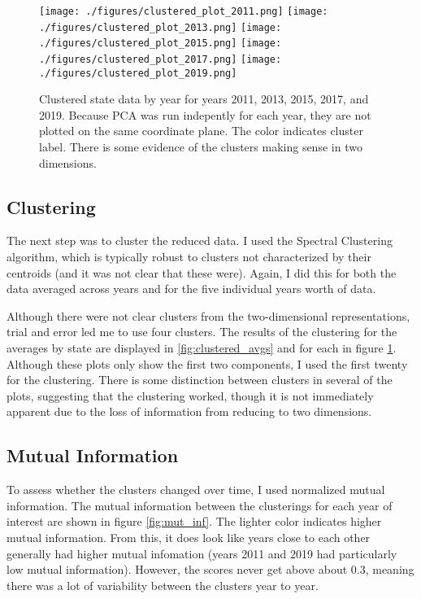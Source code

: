 \documentclass[11pt]{article}
\begin{document}
\begin{figure}[hp]
\texttt{[image: ./figures/clustered\_plot\_2011.png]}
\texttt{[image: ./figures/clustered\_plot\_2013.png]}
\texttt{[image: ./figures/clustered\_plot\_2015.png]}
\texttt{[image: ./figures/clustered\_plot\_2017.png]}
\texttt{[image: ./figures/clustered\_plot\_2019.png]}
\caption{
  Clustered state data by year for years 2011, 2013, 2015, 2017, and 2019. Because PCA was run indepently for each year, they are not plotted on the same coordinate plane. The color indicates cluster label. There is some evidence of the clusters making sense in two dimensions.
}
\label{fig:clustered_data}
\end{figure}

\subsection{Clustering}
The next step was to cluster the reduced data. I used the Spectral Clustering algorithm, which is typically robust to clusters not characterized by their centroids (and it was not clear that these were). Again, I did this for both the data averaged across years and for the five individual years worth of data. 

Although there were not clear clusters from the two-dimensional representations, trial and error led me to use four clusters. The results of the clustering for the averages by state are displayed in \ref{fig:clustered_avgs} and for each in figure \ref{fig:clustered_data}. Although these plots only show the first two components, I used the first twenty for the clustering. There is some distinction between clusters in several of the plots, suggesting that the clustering worked, though it is not immediately apparent due to the loss of information from reducing to two dimensions.

\subsection{Mutual Information}
To assess whether the clusters changed over time, I used normalized mutual information. The mutual information between the clusterings for each year of interest are shown in figure \ref{fig:mut_inf}. The lighter color indicates higher mutual information. From this, it does look like years close to each other generally had higher mutual infomation (years 2011 and 2019 had particularly low mutual information). However, the scores never get above about 0.3, meaning there was a lot of variability between the clusters year to year. 
\end{document}

